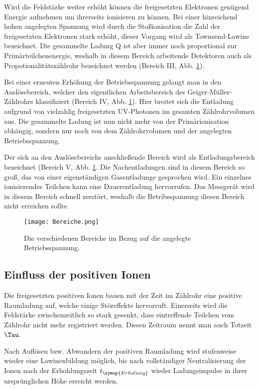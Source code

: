 Wird die Feldstärke weiter erhöht können die freigesetzten Elektronen
genügend Energie aufnehmen um ihrerseits ionisieren zu können. Bei einer hinreichend
hohen angelegten Spannung wird durch die Stoßionisation die Zahl der freigesetzten
Elektronen stark erhöht, dieser Vorgang wird als Townsend-Lawine bezeichnet.
Die gesammelte Ladung Q ist aber immer noch proportional zur Primärteilchenenergie,
weshalb in diesem Bereich arbeitende Detektoren auch als Propotionalitätszählrohr
bezeichnet werden (Bereich III, Abb. \ref{fig:Bereiche}).

Bei einer erneuten Erhöhung der Betriebsspannung gelangt man in den Auslösebereich,
welcher den eigentlichen Arbeitsbereich des Geiger-Müller-Zählrohrs klassifiziert
(Bereich IV, Abb. \ref{fig:Bereiche}).
Hier breitet sich die Entladung aufgrund von vielzahlig
freigesetzten UV-Photonen im gesamten Zählrohrvolumen aus. Die gesammelte Ladung
ist nun nicht mehr von der Primärionisation abhängig, sondern nur noch von
dem Zählrohrvolumen und der angelegten Betriebsspannung.

Der sich an den Auslösebereichs anschließende Bereich wird als Entladungsbereich
bezeichnet (Bereich V, Abb. \ref{fig:Bereiche}. Die Nachentladungen sind
in diesem Bereich so groß, das von einer eigenständigen Gasentladunge gesprochen wird.
Ein einzelnes ionisierendes Teilchen kann eine Dauerentladung hervorrufen.
Das Messgerät wird in diesem Bereich schnell zerstört, weshalb die Betribsspannung
diesen Bereich nicht erreichen sollte.

\begin{figure}
  \centering
  \texttt{[image: Bereiche.png]}
  \caption{Die verschiedenen Bereiche im Bezug auf die angelegte Betriebsspannung.\cite{anleitung01}}
  \label{fig:Bereiche}
\end{figure}

\newpage

\subsection{Einfluss der positiven Ionen}

Die freigesetzten positiven Ionen bauen mit der Zeit im Zählrohr eine positive
Raumladung auf, welche einige Störeffekte hervorruft. Einerseits wird die
Feldstärke zwischenzeitlich so stark gesenkt, dass eintreffende Teilchen vom
Zählrohr nicht mehr registriert werden. Diesen Zeitraum nennt man auch Totzeit $\Tau$.

Nach Auflösen bzw. Abwandern der positiven Raumladung wird stufenweise wieder eine
Lawinenbildung möglich, bis nach vollständiger Neutralisierung der Ionen nach der
Erhohlungszeit $t_{\symup{Erholung}}$ wieder Ladungsimpulse in ihrer ursprünglichen Höhe erreicht
werden.

